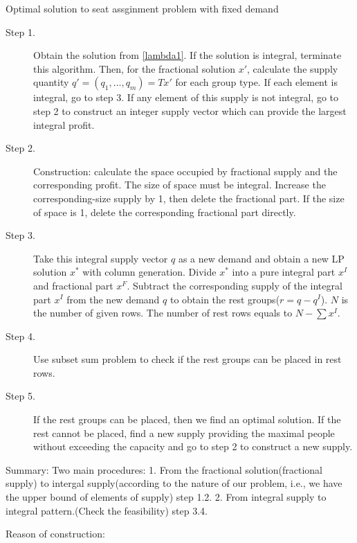 \begin{algorithm}[H]\label{algoDI}
\caption{Optimal solution to seat assginment problem with fixed demand}
\begin{description}
  \item[Step 1.] Obtain the solution from \eqref{lambda1}. If the solution is integral, terminate this algorithm. Then, for the fractional solution $x{'}$, calculate the supply quantity $q{'}=(q_1,\ldots,q_m) = Tx{'}$ for each group type. If each element is integral, go to step 3. If any element of this supply is not integral, go to step 2 to construct an integer supply vector which can provide the largest integral profit.
  \vspace{5pt}
  \item[Step 2.] Construction: calculate the space occupied by fractional supply and the corresponding profit. The size of space must be integral. Increase the corresponding-size supply by 1, then delete the fractional part. If the size of space is 1, delete the corresponding fractional part directly. 

  \item[Step 3.] Take this integral supply vector $q$ as a new demand and obtain a new LP solution $x^{*}$ with column generation. Divide $x^{*}$ into a pure integral part $x^I$ and fractional part $x^F$. Subtract the corresponding supply of the integral part $x^I$ from the new demand $q$ to obtain the rest groups($r = q - q^I$). $N$ is the number of given rows. The number of rest rows equals to $N - \sum x^I$.
  \item[Step 4.] Use subset sum problem to check if the rest groups can be placed in rest rows.
  \item[Step 5.] If the rest groups can be placed, then we find an optimal solution. If the rest cannot be placed, find a new supply providing the maximal people without exceeding the capacity and go to step 2 to construct a new supply.
\end{description}
\end{algorithm}

Summary:
Two main procedures: 1. From the fractional solution(fractional supply) to intergal supply(according to the nature of our problem, i.e., we have the upper bound of elements of supply)  step 1.2.
2. From integral supply to integral pattern.(Check the feasibility)  step 3.4.

Reason of construction:

